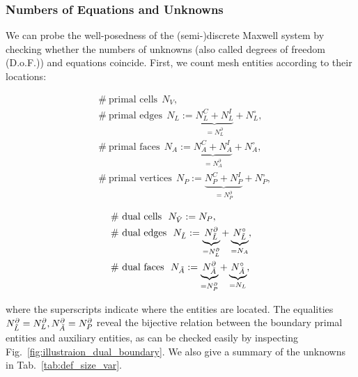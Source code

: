 \documentclass{article}
\begin{document}
\subsubsection{Numbers of Equations and Unknowns}

We can probe the well-posedness of the (semi-)discrete Maxwell system by checking whether
the numbers of unknowns (also called degrees of freedom (D.o.F.)) and equations coincide.
First, we count mesh entities according to their locations:
\begin{center}
\vspace{-0.5cm}
\begin{minipage}[t]{0.4\textwidth}
    \begin{align*}
        &\#\  \text{primal cells}\ \  N_V, \\
        &\#\  \text{primal edges}\ \  N_L := \underbrace{N^C_L + N^I_L}_{=N^\partial_L} + N^\circ_L,  \\
        &\#\  \text{primal faces}\ \  N_A := \underbrace{N_A^C + N^I_A}_{=N^\partial_A} + N^\circ_A , \\
        &\#\  \text{primal vertices}\ \  N_P := \underbrace{N_P^C + N^I_P}_{=N^\partial_P} + N^\circ_P,
    \end{align*}
\end{minipage}
\begin{minipage}[t]{0.4\textwidth}
    \begin{align*}
        &\#\  \text{dual cells}\ \  N_{\Tilde{V}} := N_P ,\\
        &\#\  \text{dual edges}\ \  N_{\Tilde{L}} := \underbrace{N^\partial_{\Tilde{L}}}_{=N^\partial_L} + \underbrace{N^\circ_{\Tilde{L}}}_{=N_A} ,\\
        &\#\  \text{dual faces}\ \  N_{\Tilde{A}} := \underbrace{N^\partial_{\Tilde{A}}}_{=N^\partial_P} + \underbrace{N^\circ_{\Tilde{A}}}_{=N_L},
    \end{align*}
\end{minipage}   
\end{center}
where the superscripts indicate where the entities are located. The equalities
$N^\partial_{\Tilde{L}} = N^\partial_L, N^\partial_{\Tilde{A}} = N^\partial_P$ reveal the
bijective relation between the boundary primal entities and auxiliary entities, as can be
checked easily by inspecting Fig.~\ref{fig:illustraion_dual_boundary}.  We also give a
summary of the unknowns in Tab.~\ref{tab:def_size_var}.
\end{document}
